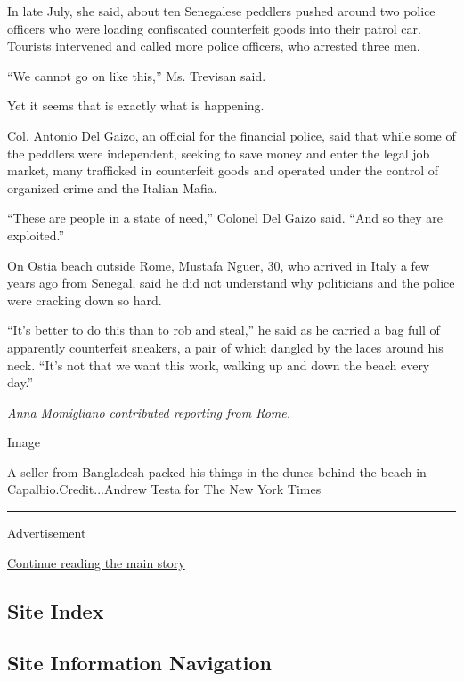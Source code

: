 In late July, she said, about ten Senegalese peddlers pushed around two
police officers who were loading confiscated counterfeit goods into
their patrol car. Tourists intervened and called more police officers,
who arrested three men.

``We cannot go on like this,'' Ms. Trevisan said.

Yet it seems that is exactly what is happening.

Col. Antonio Del Gaizo, an official for the financial police, said that
while some of the peddlers were independent, seeking to save money and
enter the legal job market, many trafficked in counterfeit goods and
operated under the control of organized crime and the Italian Mafia.

``These are people in a state of need,'' Colonel Del Gaizo said. ``And
so they are exploited.''

On Ostia beach outside Rome, Mustafa Nguer, 30, who arrived in Italy a
few years ago from Senegal, said he did not understand why politicians
and the police were cracking down so hard.

``It's better to do this than to rob and steal,'' he said as he carried
a bag full of apparently counterfeit sneakers, a pair of which dangled
by the laces around his neck. ``It's not that we want this work, walking
up and down the beach every day.''

\emph{Anna Momigliano contributed reporting from Rome.}

Image

A seller from Bangladesh packed his things in the dunes behind the beach
in Capalbio.Credit...Andrew Testa for The New York Times

\begin{center}\rule{0.5\linewidth}{\linethickness}\end{center}

Advertisement

\protect\hyperlink{after-bottom}{Continue reading the main story}

\hypertarget{site-index}{%
\subsection{Site Index}\label{site-index}}

\hypertarget{site-information-navigation}{%
\subsection{Site Information
Navigation}\label{site-information-navigation}}

